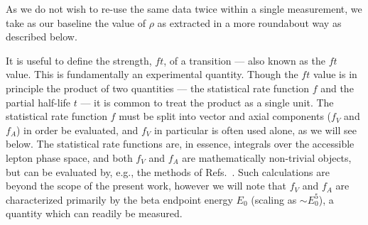 As we do not wish to re-use the same data twice within a single measurement, we take as our baseline the value of $\rho$ as extracted in a more roundabout way as described below.


It is useful to define the strength, $ft$, of a transition --- also known as the $ft$ value.  This is fundamentally an experimental quantity.  Though the $ft$ value is in principle the product of two quantities --- the statistical rate function $f$ and the partial half-life $t$ --- it is common to treat the product as a single unit.  
%
The statistical rate function $f$ must be split into vector and axial components ($f_V$ and $f_A$) in order be evaluated, and $f_V$ in particular is often used alone, as we will see below.  The statistical rate functions are, in essence, integrals over the accessible lepton phase space, and both $f_V$ and $f_A$ are mathematically non-trivial objects\cite{towner_hardy_1995_frombook}\cite{HardyTowner2005_Superallowed}, but can be evaluated by, e.g., the methods of Refs.~\cite{wilkinson2}\cite{wilkinson3}\cite{wilkinson4}.  
Such calculations are beyond the scope of the present work, however we will note that 
$f_V$ and $f_A$ are characterized primarily by the beta endpoint energy $E_0$ (scaling as $\sim E_0^5$), a quantity which can readily be measured.  

